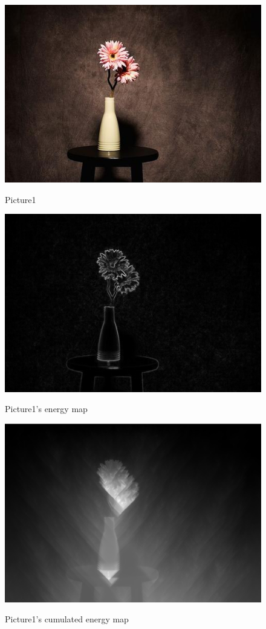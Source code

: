 \documentclass[final]{cvpr}
\begin{document}
\begin{figure}
\begin{center}
    \includegraphics[scale=0.3]{pics/2-1.jpg}
    \caption{Picture1}
    \label{pic0-1}
    \includegraphics[scale=0.15]{pics/0-2.png}
    \caption{Picture1's energy map}
    \label{pic0-2}
    \includegraphics[scale=0.15]{pics/0-3.png}
    \caption{Picture1's cumulated energy map}
    \label{pic0-3}
\end{center}
\end{figure}
\end{document}
